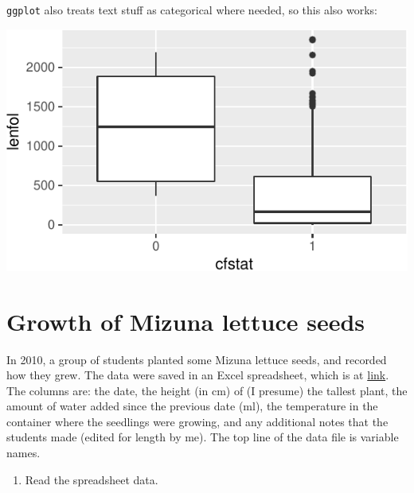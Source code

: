 \documentclass[]{tufte-book}
\newenvironment{Shaded}{}{}
\newcommand{\DataTypeTok}[1]{\textcolor[rgb]{0.56,0.13,0.00}{#1}}
\newcommand{\KeywordTok}[1]{\textcolor[rgb]{0.00,0.44,0.13}{\textbf{#1}}}
\newcommand{\NormalTok}[1]{#1}
\newcommand{\OperatorTok}[1]{\textcolor[rgb]{0.40,0.40,0.40}{#1}}
\newcommand{\StringTok}[1]{\textcolor[rgb]{0.25,0.44,0.63}{#1}}
\providecommand{\tightlist}{%
  \setlength{\itemsep}{0pt}\setlength{\parskip}{0pt}}
\theoremstyle{definition}
\theoremstyle{definition}
\theoremstyle{definition}
\theoremstyle{remark}
\begin{document}
\texttt{ggplot} also treats text stuff as categorical where needed, so
this also works:

\begin{Shaded}
\end{Shaded}

\includegraphics{13-dates-and-times_files/figure-latex/unnamed-chunk-11-1}

\hypertarget{growth-of-mizuna-lettuce-seeds}{%
\section{Growth of Mizuna lettuce
seeds}\label{growth-of-mizuna-lettuce-seeds}}

In 2010, a group of students planted some Mizuna lettuce seeds, and
recorded how they grew. The data were saved in an Excel spreadsheet,
which is at
\href{http://www.utsc.utoronto.ca/~butler/c32/mizuna.xlsx}{link}. The
columns are: the date, the height (in cm) of (I presume) the tallest
plant, the amount of water added since the previous date (ml), the
temperature in the container where the seedlings were growing, and any
additional notes that the students made (edited for length by me). The
top line of the data file is variable names.

\begin{enumerate}
\def\labelenumi{(\alph{enumi})}
\tightlist
\item
  Read the spreadsheet data.
\end{enumerate}
\end{document}
